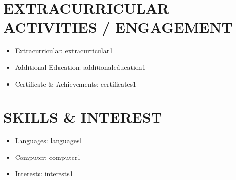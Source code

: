 \documentclass[a4paper,8pt]{article}
\begin{document}
\section{EXTRACURRICULAR ACTIVITIES / ENGAGEMENT}
\begin{itemize}[label={\large\textbullet}, left=0pt, itemsep=0.5ex, parsep=0.5ex]
    \item Extracurricular: extracurricular1
    \item Additional Education: additionaleducation1 
    \item Certificate \& Achievements: certificates1
\end{itemize}

\section{SKILLS \& INTEREST}
\begin{itemize}[label={\large\textbullet}, left=0pt, itemsep=0.5ex, parsep=0.5ex]
    \item Languages: languages1
    \item Computer: computer1
    \item Interests: interests1
\end{itemize}
\end{document}
